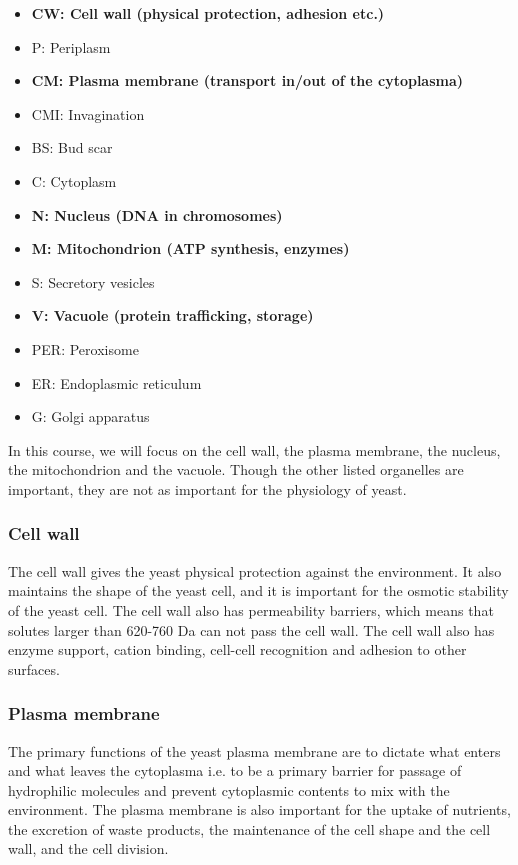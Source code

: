 \begin{highlight}
    \begin{itemize}
        \item \textbf{CW: Cell wall (physical protection, adhesion etc.)}
        \item P: Periplasm
        \item \textbf{CM: Plasma membrane (transport in/out of the cytoplasma)}
        \item CMI: Invagination
        \item BS: Bud scar
        \item C: Cytoplasm
        \item \textbf{N: Nucleus (DNA in chromosomes)}
        \item \textbf{M: Mitochondrion (ATP synthesis, enzymes)}
        \item S: Secretory vesicles
        \item \textbf{V: Vacuole (protein trafficking, storage)}
        \item PER: Peroxisome
        \item ER: Endoplasmic reticulum
        \item G: Golgi apparatus
    \end{itemize}
\end{highlight}

In this course, we will focus on the cell wall, the plasma membrane, the nucleus, the mitochondrion and the vacuole. Though the other listed organelles are important, they are not as important for the physiology of yeast.

\subsubsection*{Cell wall}
The cell wall gives the yeast physical protection against the environment. It also maintains the shape of the yeast cell, and it is important for the osmotic stability of the yeast cell. The cell wall also has permeability barriers, which means that solutes larger than 620-760 Da can not pass the cell wall. The cell wall also has enzyme support, cation binding, cell-cell recognition and adhesion to other surfaces.

\subsubsection*{Plasma membrane}
The primary functions of the yeast plasma membrane are to dictate what enters and what leaves the cytoplasma i.e. to be a primary barrier for passage of hydrophilic molecules and prevent cytoplasmic contents to mix with the environment. The plasma membrane is also important for the uptake of nutrients, the excretion of waste products, the maintenance of the cell shape and the cell wall, and the cell division.

